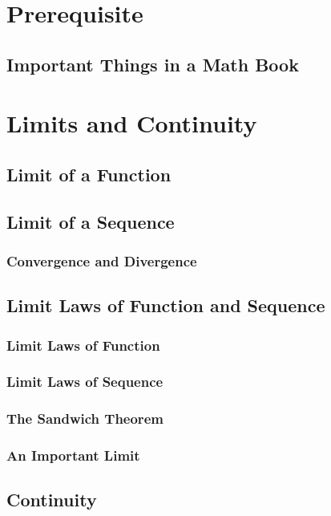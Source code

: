 
\chapter{Prerequisite}

\section{Important Things in a Math Book}

\chapter{Limits and Continuity}

\section{Limit of a Function}

\section{Limit of a Sequence}
\subsection{Convergence and Divergence}

\section{Limit Laws of Function and Sequence}
\subsection{Limit Laws of Function}
\subsection{Limit Laws of Sequence}
\subsection{The Sandwich Theorem}
\subsection{An Important Limit}

\section{Continuity}
\subsection{}

